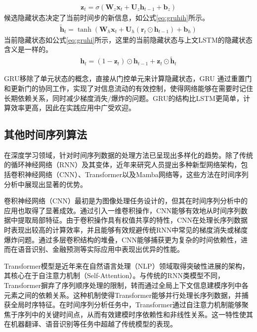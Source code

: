 \begin{align}
  \mathbf{z}_t = \sigma(\mathbf{W}_z \mathbf{x}_t + \mathbf{U}_z \mathbf{h}_{t-1} + \mathbf{b}_z) \label{eq:gruupdate}
\end{align}
候选隐藏状态决定了当前时间步的新信息，如公式\eqref{eq:gruhih}所示。
\begin{align}
  \tilde{\mathbf{h}}_t = \tanh(\mathbf{W}_h \mathbf{x}_t + \mathbf{U}_h (\mathbf{r}_t \odot \mathbf{h}_{t-1}) + \mathbf{b}_h) \label{eq:gruhih}
\end{align}
当前隐藏状态如公式\eqref{eq:gruhi}所示，这里的当前隐藏状态与上文LSTM的隐藏状态含义是一样的。
\begin{align}
  \mathbf{h}_t = (1 - \mathbf{z}_t) \odot \mathbf{h}_{t-1} + \mathbf{z}_t \odot \tilde{\mathbf{h}}_t \label{eq:gruhi}
\end{align}

GRU移除了单元状态的概念，直接从门控单元来计算隐藏状态，GRU 通过重置门和更新门的协同工作，实现了对信息流动的有效控制，使得网络能够在需要时记住长期依赖关系，同时减少梯度消失/爆炸的问题。GRU的结构比LSTM更简单，计算效率更高，因此在实践应用中广受欢迎。
\subsection{其他时间序列算法}
在深度学习领域，针对时间序列数据的处理方法已呈现出多样化的趋势。除了传统的循环神经网络（RNN）及其变体，近年来研究人员提出多种新型网络架构，包括卷积神经网络（CNN）、Transformer以及Mamba网络等，这些方法在时间序列分析中展现出显著的优势。

卷积神经网络（CNN）最初是为图像处理任务设计的，但其在时间序列分析中的应用也取得了显著成效\cite{lecun1998gradient}。通过引入一维卷积操作，CNN能够有效地从时间序列数据中提取局部特征。由于卷积操作具有权值共享的特性，CNN在处理长序列数据时表现出较高的计算效率，并且能够有效规避传统RNN中常见的梯度消失或梯度爆炸问题。通过多层卷积结构的堆叠，CNN能够捕获更为复杂的时间依赖性，进而在语音识别、金融预测等实际应用中表现出优异的性能\cite{li2021survey}。

Transformer模型是近年来在自然语言处理（NLP）领域取得突破性进展的架构，其核心在于自注意力机制（Self-Attention）\cite{Vaswanietal2017Attention}。与传统的RNN类模型不同，Transformer摒弃了序列顺序处理的限制，转而通过全局上下文信息建模序列中各元素之间的依赖关系。这种机制使得Transformer能够并行处理长序列数据，并捕获全局时序特征。在时间序列分析任务中，Transformer通过自注意力机制能够聚焦于序列中的关键时间点，从而有效建模时序依赖性和非线性关系。这一特性使其在机器翻译、语音识别等任务中超越了传统模型的表现。

